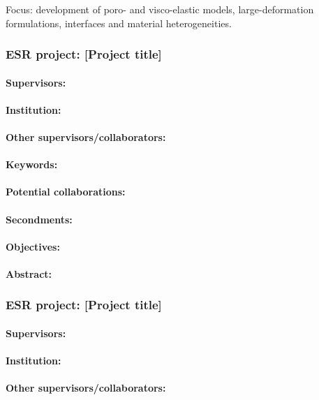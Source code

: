 \documentclass[12pt]{article}
\begin{document}
Focus: development of poro- and visco-elastic models, large-deformation formulations, interfaces and material heterogeneities.

\subsubsection*{ESR project: [Project title]}
\paragraph{Supervisors:} 
\paragraph{Institution:} 
\paragraph{Other supervisors/collaborators:} 
\paragraph{Keywords:} 
\paragraph{Potential collaborations:} 
\paragraph{Secondments:} 
\paragraph{Objectives:} 
\paragraph{Abstract:} 

\subsubsection*{ESR project: [Project title]}
\paragraph{Supervisors:} 
\paragraph{Institution:} 
\paragraph{Other supervisors/collaborators:} 
\end{document}
